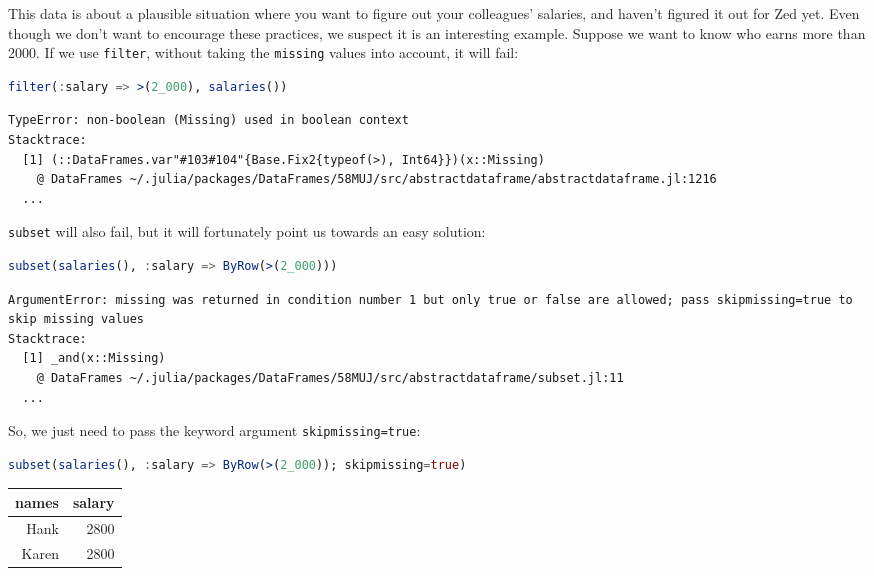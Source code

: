 \documentclass[
  notoc %
]{tufte-book}
\newcommand{\passthrough}[1]{#1}
\begin{document}
This data is about a plausible situation where you want to figure out
your colleagues' salaries, and haven't figured it out for Zed yet. Even
though we don't want to encourage these practices, we suspect it is an
interesting example. Suppose we want to know who earns more than 2000.
If we use \passthrough{\lstinline!filter!}, without taking the
\passthrough{\lstinline!missing!} values into account, it will fail:

\begin{lstlisting}[language=Julia]
filter(:salary => >(2_000), salaries())
\end{lstlisting}

\begin{lstlisting}[language=Output]
TypeError: non-boolean (Missing) used in boolean context
Stacktrace:
  [1] (::DataFrames.var"#103#104"{Base.Fix2{typeof(>), Int64}})(x::Missing)
    @ DataFrames ~/.julia/packages/DataFrames/58MUJ/src/abstractdataframe/abstractdataframe.jl:1216
  ...
\end{lstlisting}

\passthrough{\lstinline!subset!} will also fail, but it will fortunately
point us towards an easy solution:

\begin{lstlisting}[language=Julia]
subset(salaries(), :salary => ByRow(>(2_000)))
\end{lstlisting}

\begin{lstlisting}[language=Output]
ArgumentError: missing was returned in condition number 1 but only true or false are allowed; pass skipmissing=true to skip missing values
Stacktrace:
  [1] _and(x::Missing)
    @ DataFrames ~/.julia/packages/DataFrames/58MUJ/src/abstractdataframe/subset.jl:11
  ...
\end{lstlisting}

So, we just need to pass the keyword argument
\passthrough{\lstinline!skipmissing=true!}:

\begin{lstlisting}[language=Julia]
subset(salaries(), :salary => ByRow(>(2_000)); skipmissing=true)
\end{lstlisting}

\begin{longtable}[]{@{}rr@{}}
\toprule()
names & salary \\
\midrule()
\endhead
Hank & 2800 \\
Karen & 2800 \\
\bottomrule()
\end{longtable}
\end{document}
